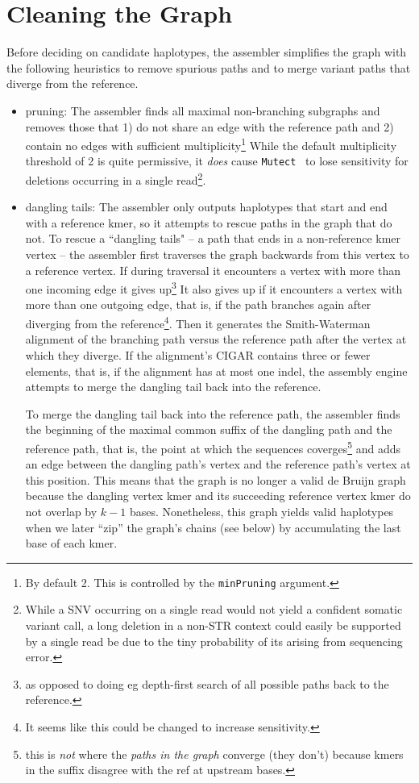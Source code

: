 \documentclass[nofootinbib,amssymb,amsmath]{revtex4}
\newcommand{\Mutect}{\texttt{Mutect}}
\newcommand{\code}[1]{\texttt{#1}}
\begin{document}
\section{Cleaning the Graph} \label{graph-cleaning}
Before deciding on candidate haplotypes, the assembler simplifies the graph with the following heuristics to remove spurious paths and to merge variant paths that diverge from the reference.
\begin{itemize}
\item pruning: The assembler finds all maximal non-branching subgraphs and removes those that 1) do not share an edge with the reference path and 2) contain no edges with sufficient multiplicity\footnote{By default 2.  This is controlled by the \code{minPruning} argument.}  While the default multiplicity threshold of 2 is quite permissive, it \textit{does} cause \Mutect~ to lose sensitivity for deletions occurring in a single read\footnote{While a SNV occurring on a single read would not yield a confident somatic variant call, a long deletion in a non-STR context could easily be supported by a single read be due to the tiny probability of its arising from sequencing error.}.
\item dangling tails: The assembler only outputs haplotypes that start and end with a reference kmer, so it attempts to rescue paths in the graph that do not.  To rescue a ``dangling tails" -- a path that ends in a non-reference kmer vertex -- the assembler first traverses the graph backwards from this vertex to a reference vertex.  If during traversal it encounters a vertex with more than one incoming edge it gives up\footnote{as opposed to doing eg depth-first search of all possible paths back to the reference.}  It also gives up if it encounters a vertex with more than one outgoing edge, that is, if the path branches again after diverging from the reference\footnote{It seems like this could be changed to increase sensitivity.}.  Then it generates the Smith-Waterman alignment of the branching path versus the reference path after the vertex at which they diverge.  If the alignment's CIGAR contains three or fewer elements, that is, if the alignment has at most one indel, the assembly engine attempts to merge the dangling tail back into the reference.

To merge the dangling tail back into the reference path, the assembler finds the beginning of the maximal common suffix of the dangling path and the reference path, that is, the point at which the sequences coverges\footnote{this is \textit{not} where the \textit{paths in the graph} converge (they don't) because kmers in the suffix disagree with the ref at upstream bases.} and adds an edge between the dangling path's vertex and the reference path's vertex at this position.  This means that the graph is no longer a valid de Bruijn graph because the dangling vertex kmer and its succeeding reference vertex kmer do not overlap by $k - 1$ bases.  Nonetheless, this graph yields valid haplotypes when we later ``zip'' the graph's chains (see below) by accumulating the last base of each kmer.


\end{itemize}
\end{document}
